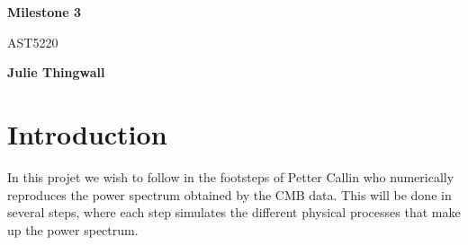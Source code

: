 \documentclass[12pt]{article}
\begin{document}
    \begin{titlepage}
        \begin{center}
            \vspace*{5cm}
            
            \Huge
            \textbf{Milestone 3}
            
            \vspace*{0.5cm}
            \LARGE
            AST5220
        
            \vspace*{0.5cm}
        
            \textbf{Julie Thingwall}
        \end{center}
    \end{titlepage}

\section{Introduction}

In this projet we wish to follow in the footsteps of Petter Callin\cite{callin2006calculate} who numerically reproduces the power spectrum obtained by the CMB data. This will be done in several steps, where each step simulates the different physical processes that make up the power spectrum.

{}

\end{document}
